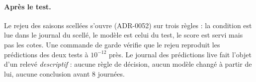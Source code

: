 \paragraph{Après le test.} Le rejeu des saisons scellées s'ouvre (ADR-0052) sur trois règles : la condition
est lue dans le journal du scellé, le modèle est celui du test, le score est servi mais pas les cotes. Une
commande de garde vérifie que le rejeu reproduit les prédictions des deux tests à \(10^{-12}\) près. Le
journal des prédictions live fait l'objet d'un relevé \emph{descriptif} : aucune règle de décision, aucun
modèle changé à partir de lui, aucune conclusion avant 8 journées.

